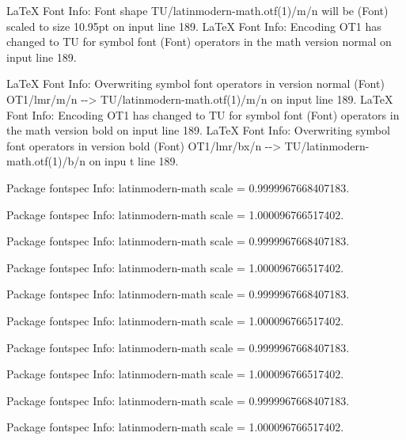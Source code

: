 \documentclass[
  letterpaper,
  DIV=11,
  numbers=noendperiod]{scrartcl}
\newenvironment{Shaded}{\begin{snugshade}}{\end{snugshade}}
\newcommand{\NormalTok}[1]{\textcolor[rgb]{0.00,0.23,0.31}{#1}}
\begin{document}
\begin{Shaded}
\begin{Highlighting}[]
\NormalTok{LaTeX Font Info:    Font shape \textasciigrave{}TU/latinmodern{-}math.otf(1)/m/n\textquotesingle{} will be}
\NormalTok{(Font)              scaled to size 10.95pt on input line 189.}
\NormalTok{LaTeX Font Info:    Encoding \textasciigrave{}OT1\textquotesingle{} has changed to \textasciigrave{}TU\textquotesingle{} for symbol font}
\NormalTok{(Font)              \textasciigrave{}operators\textquotesingle{} in the math version \textasciigrave{}normal\textquotesingle{} on input line 189.}

\NormalTok{LaTeX Font Info:    Overwriting symbol font \textasciigrave{}operators\textquotesingle{} in version \textasciigrave{}normal\textquotesingle{}}
\NormalTok{(Font)                  OT1/lmr/m/n {-}{-}\textgreater{} TU/latinmodern{-}math.otf(1)/m/n on input}
\NormalTok{ line 189.}
\NormalTok{LaTeX Font Info:    Encoding \textasciigrave{}OT1\textquotesingle{} has changed to \textasciigrave{}TU\textquotesingle{} for symbol font}
\NormalTok{(Font)              \textasciigrave{}operators\textquotesingle{} in the math version \textasciigrave{}bold\textquotesingle{} on input line 189.}
\NormalTok{LaTeX Font Info:    Overwriting symbol font \textasciigrave{}operators\textquotesingle{} in version \textasciigrave{}bold\textquotesingle{}}
\NormalTok{(Font)                  OT1/lmr/bx/n {-}{-}\textgreater{} TU/latinmodern{-}math.otf(1)/b/n on inpu}
\NormalTok{t line 189.}

\NormalTok{Package fontspec Info: latinmodern{-}math scale = 0.9999967668407183.}


\NormalTok{Package fontspec Info: latinmodern{-}math scale = 1.000096766517402.}


\NormalTok{Package fontspec Info: latinmodern{-}math scale = 0.9999967668407183.}


\NormalTok{Package fontspec Info: latinmodern{-}math scale = 1.000096766517402.}


\NormalTok{Package fontspec Info: latinmodern{-}math scale = 0.9999967668407183.}


\NormalTok{Package fontspec Info: latinmodern{-}math scale = 1.000096766517402.}


\NormalTok{Package fontspec Info: latinmodern{-}math scale = 0.9999967668407183.}


\NormalTok{Package fontspec Info: latinmodern{-}math scale = 1.000096766517402.}


\NormalTok{Package fontspec Info: latinmodern{-}math scale = 0.9999967668407183.}


\NormalTok{Package fontspec Info: latinmodern{-}math scale = 1.000096766517402.}



\end{Highlighting}
\end{Shaded}
\end{document}
